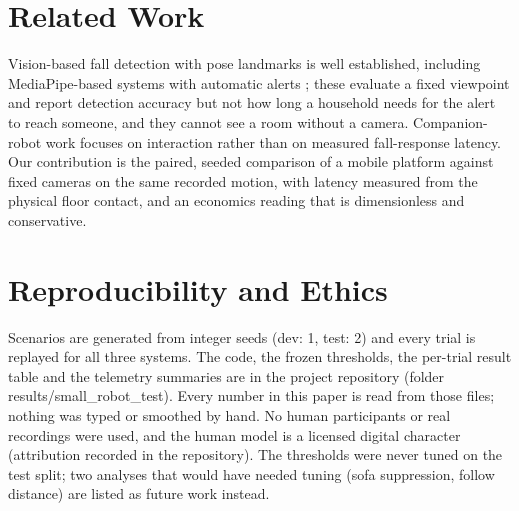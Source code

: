 \documentclass[11pt,twocolumn]{article}
\begin{document}
\section{Related Work}
Vision-based fall detection with pose landmarks is well established, including MediaPipe-based systems with automatic alerts \cite{kothari}; these evaluate a fixed viewpoint and report detection accuracy but not how long a household needs for the alert to reach someone, and they cannot see a room without a camera. Companion-robot work focuses on interaction rather than on measured fall-response latency. Our contribution is the paired, seeded comparison of a mobile platform against fixed cameras on the same recorded motion, with latency measured from the physical floor contact, and an economics reading that is dimensionless and conservative.
\section{Reproducibility and Ethics}
Scenarios are generated from integer seeds (dev: 1, test: 2) and every trial is replayed for all three systems. The code, the frozen thresholds, the per-trial result table and the telemetry summaries are in the project repository (folder results/small\_robot\_test). Every number in this paper is read from those files; nothing was typed or smoothed by hand. No human participants or real recordings were used, and the human model is a licensed digital character (attribution recorded in the repository). The thresholds were never tuned on the test split; two analyses that would have needed tuning (sofa suppression, follow distance) are listed as future work instead.
\end{document}
